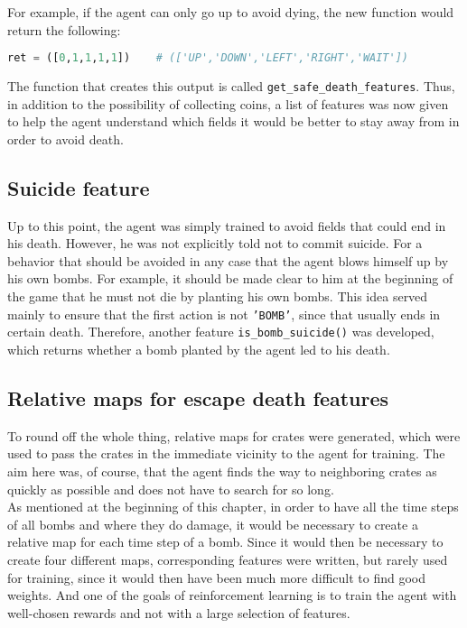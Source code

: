 For example, if the agent can only go up to avoid dying, the new function would return the following:
\vspace{0.1cm}
\begin{lstlisting}[language=python, keywordstyle=\color{black}]
  ret = ([0,1,1,1,1])    # (['UP','DOWN','LEFT','RIGHT','WAIT'])
\end{lstlisting}
\vspace{0.1cm}
The function that creates this output is called \texttt{get\_safe\_death\_features}. Thus, in addition to the possibility of collecting coins, a list of features was now given to help the agent understand which fields it would be better to stay away from in order to avoid death.

\subsection{Suicide feature}
Up to this point, the agent was simply trained to avoid fields that could end in his death. However, he was not explicitly told not to commit suicide. For a behavior that should be avoided in any case that the agent blows himself up by his own bombs. For example, it should be made clear to him at the beginning of the game that he must not die by planting his own bombs. This idea served mainly to ensure that the first action is not \texttt{'BOMB'}, since that usually ends in certain death. Therefore, another feature \texttt{is\_bomb\_suicide()} was developed, which returns whether a bomb planted by the agent led to his death.

\subsection{Relative maps for escape death features}
To round off the whole thing, relative maps for crates were generated, which were used to pass the crates in the immediate vicinity to the agent for training. The aim here was, of course, that the agent finds the way to neighboring crates as quickly as possible and does not have to search for so long.
\\

As mentioned at the beginning of this chapter, in order to have all the time steps of all bombs and where they do damage, it would be necessary to create a relative map for each time step of a bomb. Since it would then be necessary to create four different maps, corresponding features were written, but rarely used for training, since it would then have been much more difficult to find good weights. And one of the goals of reinforcement learning is to train the agent with well-chosen rewards and not with a large selection of features.

